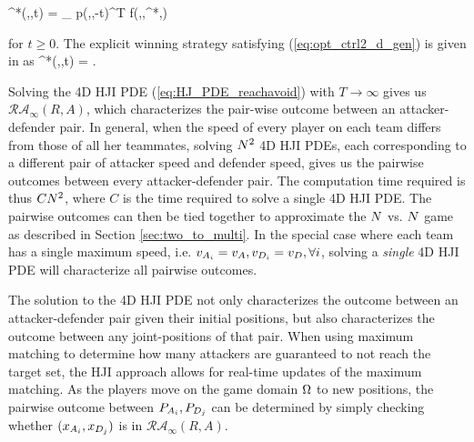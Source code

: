 \bq \label{eq:opt_ctrl2_d_gen}
  \cb^*(\xa,\xb,t) = \arg \max_{\cb \in {}} p(\xa,\xb,-t)^T f(\xa,\xb,\ca^*,\cb)
\eq

\noindent for $t\ge 0$. The explicit winning strategy satisfying (\ref{eq:opt_ctrl2_d_gen}) is given in \cite{Huang2011} as
\bq \label{eq:opt_ctrl2_d}
\cb^*(\xa,\xb,t) = \velb {}.
\eq

Solving the 4D HJI PDE (\ref{eq:HJ_PDE_reachavoid}) with $T\rightarrow \infty$ gives us $\mathcal{RA}_\infty(R,A)$, which characterizes the pair-wise outcome between an attacker-defender pair. In general, when the speed of every player on each team differs from those of all her teammates, solving $N^2$ 4D HJI PDEs, each corresponding to a different pair of attacker speed and defender speed, gives us the pairwise outcomes between every attacker-defender pair. The computation time required is thus $C N^2$, where $C$ is the time required to solve a single 4D HJI PDE. The pairwise outcomes can then be tied together to approximate the $N$ vs. $N$ game as described in Section \ref{sec:two_to_multi}. In the special case where each team has a single maximum speed, i.e. $v_{A_{i}} = v_A, v_{D_{i}} = v_D, \forall i$, solving a \textit{single} 4D HJI PDE will characterize all pairwise outcomes.

The solution to the 4D HJI PDE not only characterizes the outcome between an attacker-defender pair given their initial positions, but also characterizes the outcome between any joint-positions of that pair. When using maximum matching to determine how many attackers are guaranteed to not reach the target set, the HJI approach allows for real-time updates of the maximum matching. As the players move on the game domain $\Omega$ to new positions, the pairwise outcome between $P_{A_{i}},P_{D_{j}}$ can be determined by simply checking whether $(x_{A_{i}}, x_{D_{j}})$ is in $\mathcal{RA}_\infty(R,A)$.



